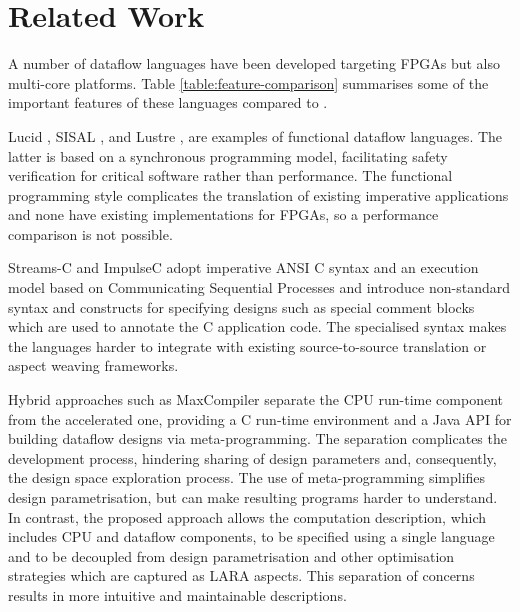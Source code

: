 \section{Related Work}

A number of dataflow languages have been developed targeting FPGAs but
also multi-core platforms. Table \ref{table:feature-comparison}
summarises some of the important features of these languages compared
to \MAXC{}.

Lucid \cite{ashcroft1977lucid}, SISAL \cite{gurd1987implicit},
\cite{mcgraw1983sisal} and Lustre \cite{halbwachs1991synchronous}, are
examples of functional dataflow languages. The latter is based on a
synchronous programming model, facilitating safety verification for
critical software \cite{halbwachs1992programming} rather than
performance. The functional programming style complicates the
translation of existing imperative applications and none have existing
implementations for FPGAs, so a performance comparison is not
possible.

Streams-C\cite{Gokhale:Stone:Arnold:Kalinowski:2000} and
ImpulseC\cite{ImpulseC} adopt imperative ANSI C syntax and an
execution model based on Communicating Sequential Processes and
introduce non-standard syntax and constructs for specifying designs
such as special comment blocks which are used to annotate the C
application code. The specialised syntax makes the languages harder to
integrate with existing source-to-source translation or aspect weaving
frameworks.

Hybrid approaches such as MaxCompiler\cite{5719584} separate the CPU
run-time component from the accelerated one, providing a C run-time
environment and a Java API for building dataflow designs via
meta-programming. The separation complicates the development process,
hindering sharing of design parameters and, consequently, the design
space exploration process. The use of meta-programming simplifies
design parametrisation, but can make resulting programs harder to
understand. In contrast, the proposed approach allows the computation
description, which includes CPU and dataflow components, to be specified
using a single language and to be decoupled from design
parametrisation and other optimisation strategies which are captured
as LARA aspects. This separation of concerns results in more intuitive
and maintainable descriptions.

